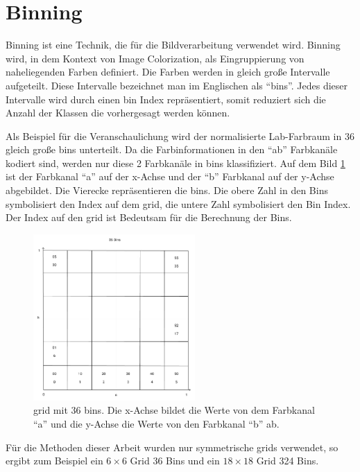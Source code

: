 \section{Binning}\label{section:binning}
Binning ist eine Technik, die für die Bildverarbeitung verwendet wird. Binning wird, in dem Kontext von Image Colorization, als Eingruppierung 
von naheliegenden Farben definiert. Die Farben werden in gleich große Intervalle aufgeteilt. Diese Intervalle bezeichnet man im Englischen als
``\gls{bin}s''. Jedes dieser Intervalle wird durch einen \gls{bin} Index repräsentiert, somit reduziert sich die Anzahl der Klassen die vorhergesagt werden
können.

Als Beispiel für die Veranschaulichung wird der normalisierte Lab-Farbraum in 36 gleich große \gls{bin}s unterteilt. Da die Farbinformationen 
in den ``ab'' Farbkanäle kodiert sind, werden nur diese 2 Farbkanäle in \gls{bin}s klassifiziert. Auf dem Bild \ref{image:bins} ist der Farbkanal 
``a'' auf der x-Achse und der ``b'' Farbkanal auf der y-Achse abgebildet. Die Vierecke repräsentieren die \gls{bin}s. Die obere Zahl in den Bins 
symbolisiert den Index auf dem \gls{grid}, die untere Zahl symbolisiert den Bin Index. Der Index auf den \gls{grid} ist Bedeutsam für die Berechnung der Bins.

\begin{figure}[H]
  \centering
  \includegraphics[width=0.55\textwidth]{resources/bins/bins.jpg}
  \caption{
  \gls{grid} mit 36 bins. Die x-Achse bildet die Werte von dem Farbkanal ``a'' und die y-Achse die Werte von den Farbkanal ``b'' ab.
  }
  \label{image:bins}
\end{figure}

Für die Methoden dieser Arbeit wurden nur symmetrische \gls{grid}s verwendet, so ergibt zum Beispiel ein $6 \times 6$ Grid 36 Bins und 
ein $18 \times 18$ Grid 324 Bins.

